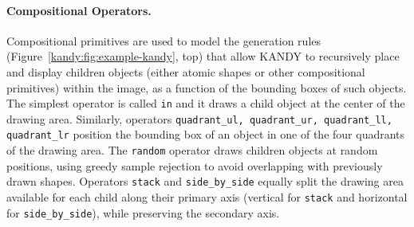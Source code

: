 \paragraph{Compositional Operators.} Compositional primitives are used to model the generation rules (Figure~\ref{kandy:fig:example-kandy}, top) that allow \textsc{KANDY} to recursively place and display children objects (either atomic shapes or other compositional primitives) within the image, as a function of the bounding boxes of such objects. %
%
%
The simplest operator is called \texttt{in} and it draws a child object at the center of the drawing area.
%
Similarly, operators \texttt{quadrant\_ul, quadrant\_ur, quadrant\_ll, quadrant\_lr}
position the bounding box of an object in one of the four quadrants of the drawing area.
%
The \texttt{random} operator draws children objects at random positions, using greedy sample rejection to avoid overlapping with previously drawn shapes.
%
Operators \texttt{stack} and \texttt{side\_by\_side} equally split the drawing area available for each child along their primary axis (vertical for \texttt{stack} and horizontal for \texttt{side\_by\_side}), while preserving the secondary axis.
